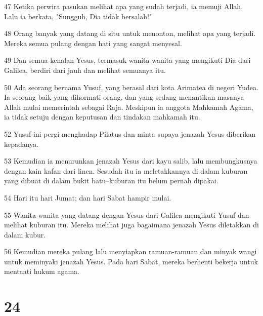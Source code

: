 \par 47 Ketika perwira pasukan melihat apa yang sudah terjadi, ia memuji Allah. Lalu ia berkata, "Sungguh, Dia tidak bersalah!"
\par 48 Orang banyak yang datang di situ untuk menonton, melihat apa yang terjadi. Mereka semua pulang dengan hati yang sangat menyesal.
\par 49 Dan semua kenalan Yesus, termasuk wanita-wanita yang mengikuti Dia dari Galilea, berdiri dari jauh dan melihat semuanya itu.
\par 50 Ada seorang bernama Yusuf, yang berasal dari kota Arimatea di negeri Yudea. Ia seorang baik yang dihormati orang, dan yang sedang menantikan masanya Allah mulai memerintah sebagai Raja. Meskipun ia anggota Mahkamah Agama, ia tidak setuju dengan keputusan dan tindakan mahkamah itu.
\par 52 Yusuf ini pergi menghadap Pilatus dan minta supaya jenazah Yesus diberikan kepadanya.
\par 53 Kemudian ia menurunkan jenazah Yesus dari kayu salib, lalu membungkusnya dengan kain kafan dari linen. Sesudah itu ia meletakkannya di dalam kuburan yang dibuat di dalam bukit batu--kuburan itu belum pernah dipakai.
\par 54 Hari itu hari Jumat; dan hari Sabat hampir mulai.
\par 55 Wanita-wanita yang datang dengan Yesus dari Galilea mengikuti Yusuf dan melihat kuburan itu. Mereka melihat juga bagaimana jenazah Yesus diletakkan di dalam kubur.
\par 56 Kemudian mereka pulang lalu menyiapkan ramuan-ramuan dan minyak wangi untuk meminyaki jenazah Yesus. Pada hari Sabat, mereka berhenti bekerja untuk mentaati hukum agama.

\chapter{24}

